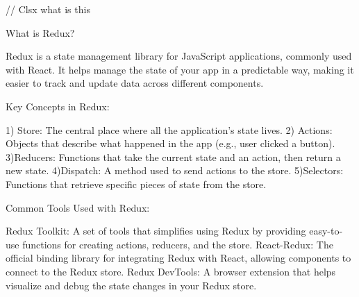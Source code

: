 // Clsx   what is this 

What is Redux?

Redux is a state management library for JavaScript applications, commonly used with React. It helps manage the state of your app in a predictable way, making it easier to track and update data across different components.

Key Concepts in Redux:

1) Store: The central place where all the application's state lives.
2) Actions: Objects that describe what happened in the app (e.g., user clicked a button).
3)Reducers: Functions that take the current state and an action, then return a new state.
4)Dispatch: A method used to send actions to the store.
5)Selectors: Functions that retrieve specific pieces of state from the store.

Common Tools Used with Redux:

Redux Toolkit: A set of tools that simplifies using Redux by providing easy-to-use functions for creating actions, reducers, and the store.
React-Redux: The official binding library for integrating Redux with React, allowing components to connect to the Redux store.
Redux DevTools: A browser extension that helps visualize and debug the state changes in your Redux store.

